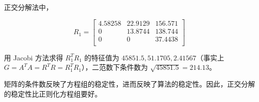 \documentclass{ctexart}
\begin{document}
正交分解法中，

\begin{equation}
R_1=
\begin{bmatrix}
4.58258 & 22.9129 & 156.571 \\
0 & 13.8744 & 138.744 \\
0 & 0 & 37.4438 \\
\end{bmatrix}
\end{equation}

用 Jacobi 方法求得 $R_1^TR_1$ 的特征值为 $45851.5,51.1705,2.41567$（事实上 $G=A^TA=R^TR=R_1^TR_1$），二范数下条件数为 $\sqrt{45851.5}=214.13$。

矩阵的条件数反映了方程组的稳定性，进而反映了算法的稳定性。因此，正交分解的稳定性比正则化方程组要好。
\end{document}

